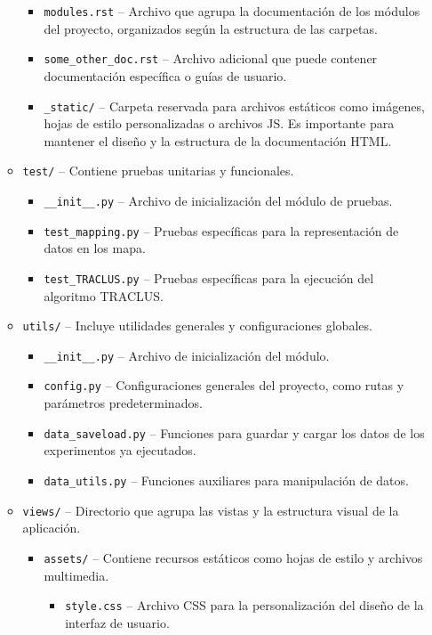 \begin{itemize}
\begin{itemize}
\begin{itemize}
   			\item \texttt{modules.rst} -- Archivo que agrupa la documentación de los módulos del proyecto, organizados según la estructura de las carpetas.
    			\item \texttt{some\_other\_doc.rst} -- Archivo adicional que puede contener documentación específica o guías de usuario.
    			\item \texttt{\_static/} -- Carpeta reservada para archivos estáticos como imágenes, hojas de estilo personalizadas o archivos JS. Es importante para mantener el diseño y la estructura de la documentación HTML.
		\end{itemize}
        	\item \texttt{test/} -- Contiene pruebas unitarias y funcionales.
        	\begin{itemize}
        		\item \texttt{\_\_init\_\_.py} -- Archivo de inicialización del módulo de pruebas.
        		\item \texttt{test\_mapping.py} -- Pruebas específicas para la representación de datos en los mapa.
        		\item \texttt{test\_TRACLUS.py} -- Pruebas específicas para la ejecución del algoritmo TRACLUS.
		\end{itemize}
        	\item \texttt{utils/} -- Incluye utilidades generales y configuraciones globales.
        	\begin{itemize}
        		\item \texttt{\_\_init\_\_.py} -- Archivo de inicialización del módulo.
         	\item \texttt{config.py} -- Configuraciones generales del proyecto, como rutas y parámetros predeterminados.
         	\item \texttt{data\_saveload.py} -- Funciones para guardar y cargar los datos de los experimentos ya ejecutados.
        		\item \texttt{data\_utils.py} -- Funciones auxiliares para manipulación de datos.
        	\end{itemize}
        	\item \texttt{views/} -- Directorio que agrupa las vistas y la estructura visual de la aplicación.
 		\begin{itemize}
        		\item \texttt{assets/} -- Contiene recursos estáticos como hojas de estilo y archivos multimedia.
			\begin{itemize}
            		\item \texttt{style.css} -- Archivo CSS para la personalización del diseño de la interfaz de usuario.

\end{itemize}
\end{itemize}
\end{itemize}
\end{itemize}
